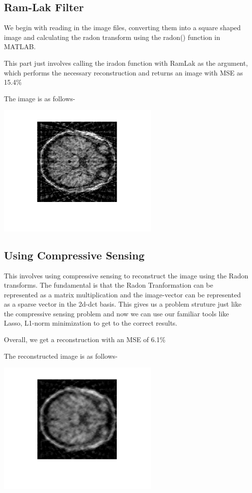 \documentclass[a4paper,11pt]{article}
\numberwithin{definition}{section}
\numberwithin{mytheorem}{subsection}
\begin{document}
\subsection{Ram-Lak Filter}

We begin with reading in the image files, converting them into a square shaped image and calculating the radon transform using the radon() function in MATLAB.

This part just involves calling the iradon function with RamLak as the argument, which performs the necessary reconstruction and returns an image with MSE as 15.4\%

The image is as follows-
\begin{center}
    \includegraphics[width=8cm]{RamLak_tomography.png}
\end{center}
\subsection{Using Compressive Sensing}
This involves using compressive sensing to reconstruct the image using the Radon transforms. The fundamental is that the Radon Tranformation can be represented as a matrix multiplication and the image-vector can be represented as a sparse vector in the 2d-dct basis. This gives us a problem struture just like the compressive sensing problem and now we can use our familiar tools like Lasso, L1-norm minimization to get to the correct results.

Overall, we get a reconstruction with an MSE of 6.1\%

The reconstructed image is as follows-
\begin{center}
    \includegraphics[width=8cm]{CS_tomography.png }
\end{center}
\end{document}
